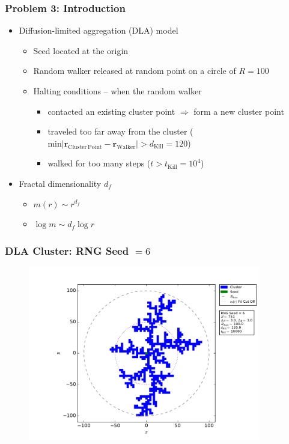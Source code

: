 \documentclass[mathserif,18pt,xcolor=table]{beamer}
\begin{document}
\begin{frame}
  \frametitle{Problem 3: Introduction}
  \begin{itemize}
    \item Diffusion-limited aggregation (DLA) model
    \begin{itemize}
    	\item Seed located at the origin
	\item Random walker released at random point on a circle of $R=100$
	\item Halting conditions -- when the random walker
	\begin{itemize}
		\item contacted an existing cluster point $\Rightarrow$ form a new cluster point
		\item traveled too far away from the cluster ($\mathrm{min}\left|\mathbf{r}_{\mathrm{Cluster\,Point}} - \mathbf{r}_{\mathrm{Walker}}\right|  > d_{\mathrm{Kill}} = 120$)
		\item walked for too many steps ($t > t_{\mathrm{Kill}} = 10^{4}$)
	\end{itemize}
    \end{itemize}
    \item Fractal dimensionality $d_f$
    \begin{itemize}
    	\item $m(r)\sim r^{d_f}$
    	\item $\log m\sim {d_f}\log r$
    \end{itemize}
  \end{itemize}
\end{frame}

\begin{frame}
  \frametitle{DLA Cluster: RNG Seed $= 6$}
\begin{figure}
  \centering
  \includegraphics[width=0.9\textwidth]{problem_3/large_cluster_seed_num_6.pdf}
\end{figure}
\end{frame}
\end{document}
